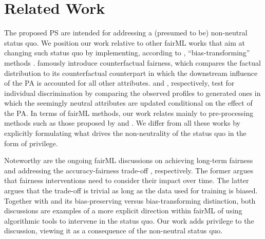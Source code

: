 \section{Related Work}
\label{sec:related-work}

The proposed PS are intended for addressing a (presumed to be) non-neutral status quo.
We position our work relative to other fairML works that aim at changing such status quo by implementing, according to 
\citet{wachter_bias_2021}, ``bias-transforming'' methods \citep[e.g.,][]{kusner_counterfactual_2017, black_fliptest_2020, alvarez_counterfactual_2023}.
\citet{kusner_counterfactual_2017} famously introduce counterfactual fairness, which compares the factual distribution to its counterfactual counterpart \citep[using the steps of abduction, action, and prediction of][]{PearlCausality2009} in which the downstream influence of the PA is accounted for all other attributes.
\citet{black_fliptest_2020} and \citet{alvarez_counterfactual_2023}, respectively, test for individual discrimination by comparing the observed profiles to generated ones in which the seemingly neutral attributes are updated conditional on the effect of the PA.
In terms of fairML methods, our work relates mainly to pre-processing methods such as those proposed by \citet{plecko_fair_2020} and \citet{bothmann_causal_2023}.
We differ from all these works by explicitly formulating what drives the non-neutrality of the status quo in the form of privilege.

Noteworthy are the ongoing fairML discussions on achieving long-term fairness \citep[e.g.,][]{DBLP:conf/www/HuC18, DBLP:conf/fat/DAmourSABSH20, DBLP:conf/fat/SchwobelR22} and addressing the accuracy-fairness trade-off  \citep[e.g.,][]{DBLP:conf/nips/WickpT19, DBLP:journals/corr/abs-2011-03173, DBLP:journals/natmi/RodolfaLG21, leininger-tradeoffs-2025}, respectively.
The former argues that fairness interventions need to consider their impact over time. 
The latter argues that the trade-off is trivial as long as the data used for training is biased. 
Together with \citet{wachter_bias_2021} and its bias-preserving versus bias-transforming distinction, 
both discussions are examples of a more explicit direction within fairML of using algorithmic tools to intervene in the status quo.
Our work adds privilege to the discussion, viewing it as a consequence of the non-neutral status quo.


